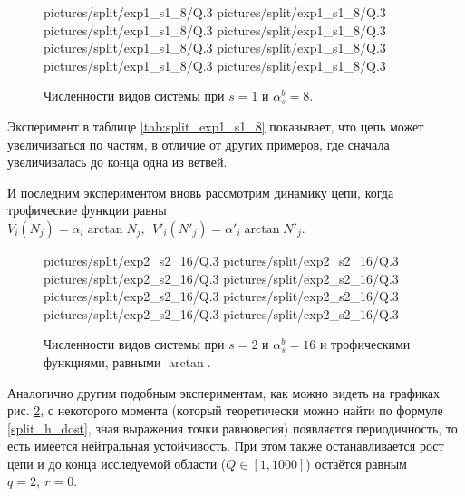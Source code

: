 \begin{figure}[H]
    \centering
       {pictures/split/exp1_s1_8/Q}{.3}
      {pictures/split/exp1_s1_8/Q}{.3}
      {pictures/split/exp1_s1_8/Q}{.3}
      {pictures/split/exp1_s1_8/Q}{.3}
      {pictures/split/exp1_s1_8/Q}{.3}
      {pictures/split/exp1_s1_8/Q}{.3}
      {pictures/split/exp1_s1_8/Q}{.3}
     {pictures/split/exp1_s1_8/Q}{.3}
\caption{Численности видов системы при \(s=1\) и \(\alpha^b_s = 8\).} \label{fig:split_exp1_s1_8}
\end{figure}
Эксперимент в таблице \ref{tab:split_exp1_s1_8} показывает, что цепь может увеличиваться по частям, в отличие от других примеров, где сначала увеличивалась до конца одна из ветвей.

И последним экспериментом вновь рассмотрим динамику цепи, когда трофические функции равны \(V_i(N_j) = \alpha_i \arctan{N_j}, ~~ V'_i(N'_j) = \alpha'_i \arctan{N'_j}\).
\begin{figure}[H]
    \centering
       {pictures/split/exp2_s2_16/Q}{.3}
       {pictures/split/exp2_s2_16/Q}{.3}
      {pictures/split/exp2_s2_16/Q}{.3}
      {pictures/split/exp2_s2_16/Q}{.3}
      {pictures/split/exp2_s2_16/Q}{.3}
      {pictures/split/exp2_s2_16/Q}{.3}
      {pictures/split/exp2_s2_16/Q}{.3}
     {pictures/split/exp2_s2_16/Q}{.3}
\caption{Численности видов системы при \(s=2\) и \(\alpha^b_s = 16\) и трофическими функциями, равными \(\arctan\).} \label{fig:split_exp2_s2_16}
\end{figure}
Аналогично другим подобным экспериментам, как можно видеть на графиках рис. \ref{fig:split_exp2_s2_16}, с некоторого момента (который теоретически можно найти по формуле \eqref{split_h_dost}, зная выражения точки равновесия) появляется периодичность, то есть имеется нейтральная устойчивость. При этом также останавливается рост цепи и до конца исследуемой области (\(Q \in [1, 1000]\)) остаётся равным \(q=2, ~ r=0\).